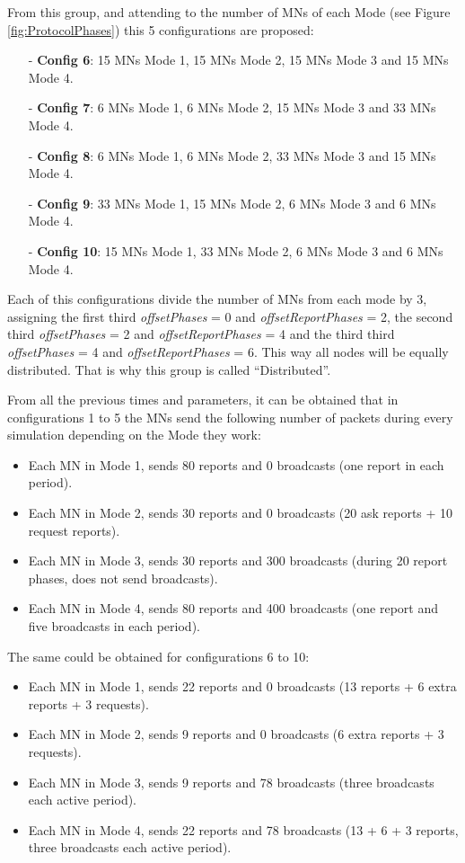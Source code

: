 \begin{itemize}
From this group, and attending to the number of \acp{MN} of each Mode (see Figure \ref{fig:ProtocolPhases}) this 5 configurations are proposed:
\begin{itemize}
 \item[-] \textbf{Config 6}: 15 \acp{MN} Mode 1, 15 \acp{MN} Mode 2, 15 \acp{MN} Mode 3 and 15 \acp{MN} Mode 4.
 \item[-] \textbf{Config 7}: 6 \acp{MN} Mode 1, 6 \acp{MN} Mode 2, 15 \acp{MN} Mode 3 and 33 \acp{MN} Mode 4.
 \item[-] \textbf{Config 8}: 6 \acp{MN} Mode 1, 6 \acp{MN} Mode 2, 33 \acp{MN} Mode 3 and 15 \acp{MN} Mode 4.
 \item[-] \textbf{Config 9}: 33 \acp{MN} Mode 1, 15 \acp{MN} Mode 2, 6 \acp{MN} Mode 3 and 6 \acp{MN} Mode 4.
 \item[-] \textbf{Config 10}: 15 \acp{MN} Mode 1, 33 \acp{MN} Mode 2, 6 \acp{MN} Mode 3 and 6 \acp{MN} Mode 4.
\end{itemize}
Each of this configurations divide the number of \acp{MN} from each mode by 3, assigning the first third \textit{offsetPhases} = 0 and 
\textit{offsetReportPhases} = 2, the second third \textit{offsetPhases} = 2 and \textit{offsetReportPhases} = 4 and the third third
\textit{offsetPhases} = 4 and \textit{offsetReportPhases} = 6. This way all nodes will be equally distributed. That is why this group is called
``Distributed''. 
\end{itemize}

From all the previous times and parameters, it can be obtained that in configurations 1 to 5 the \acp{MN} send the following number of packets during
every simulation depending on the Mode they work:
\begin{itemize}
 \item Each \ac{MN} in Mode 1, sends 80 reports and 0 broadcasts (one report in each period).
 \item Each \ac{MN} in Mode 2, sends 30 reports and 0 broadcasts (20 ask reports + 10 request reports).
 \item Each \ac{MN} in Mode 3, sends 30 reports and 300 broadcasts (during 20 report phases, does not send broadcasts).
 \item Each \ac{MN} in Mode 4, sends 80 reports and 400 broadcasts (one report and five broadcasts in each period).
\end{itemize}
The same could be obtained for configurations 6 to 10:
\begin{itemize}
 \item Each \ac{MN} in Mode 1, sends 22 reports and 0 broadcasts (13 reports + 6 extra reports + 3 requests).
 \item Each \ac{MN} in Mode 2, sends 9 reports and 0 broadcasts (6 extra reports + 3 requests).
 \item Each \ac{MN} in Mode 3, sends 9 reports and 78 broadcasts (three broadcasts each active period).
 \item Each \ac{MN} in Mode 4, sends 22 reports and 78 broadcasts (13 + 6 + 3 reports, three broadcasts each active period).
\end{itemize}

